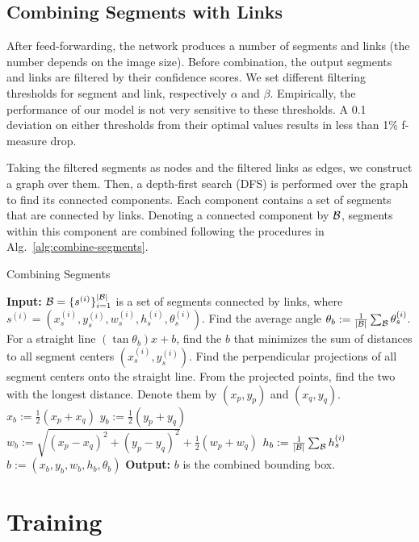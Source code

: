 \documentclass[10pt,twocolumn,letterpaper]{article}
\begin{document}
\subsection{Combining Segments with Links}
After feed-forwarding, the network produces a number of segments and links (the number depends on the image size).
Before combination, the output segments and links are filtered by their confidence scores.
We set different filtering thresholds for segment and link, respectively $\alpha$ and $\beta$.
Empirically, the performance of our model is not very sensitive to these thresholds.
A 0.1 deviation on either thresholds from their optimal values results in less than 1\% f-measure drop.

Taking the filtered segments as nodes and the filtered links as edges, we construct a graph over them. Then, a depth-first search (DFS) is performed over the graph to find its connected components. Each component contains a set of segments that are connected by links.
Denoting a connected component by ${\cal B}$, segments within this component are combined following the procedures in Alg.~\ref{alg:combine-segments}.

\begin{algorithm}[h]
\caption{Combining Segments}
\begin{algorithmic}[1]
  \STATE \textbf{Input:} ${\cal B} = \{ s^{(i)} \} _{i=1}^{|{\cal B}|}$ is a set of segments connected by links, where $s^{(i)} = (x_s^{(i)}, y_s^{(i)}, w_s^{(i)}, h_s^{(i)}, \theta_s^{(i)})$.
  \STATE Find the average angle $\theta_b := \frac{1}{|{\cal B}|} \sum_{{\cal B}} \theta_{s}^{(i)}$.
  \STATE For a straight line $(\tan \theta_b) x + b$, find the $b$ that minimizes the sum of distances to all segment centers $(x_s^{(i)}, y_s^{(i)})$.
  \STATE Find the perpendicular projections of all segment centers onto the straight line.
  \STATE From the projected points, find the two with the longest distance. Denote them by $(x_p, y_p)$ and $(x_q, y_q)$.
  \STATE $x_b := \frac{1}{2} (x_p + x_q)$
  \STATE $y_b := \frac{1}{2} (y_p + y_q)$
  \STATE $w_b := \sqrt{(x_p-x_q)^2+(y_p-y_q)^2} + \frac{1}{2} (w_p + w_q)$
  \STATE $h_b := \frac{1}{|{\cal B}|} \sum_{{\cal B}} h_{s}^{(i)}$
  \STATE $b := (x_b, y_b, w_b, h_b, \theta_b)$
  \STATE \textbf{Output:} $b$ is the combined bounding box.
\end{algorithmic}
\label{alg:combine-segments}
\end{algorithm}

\section{Training}
\end{document}
